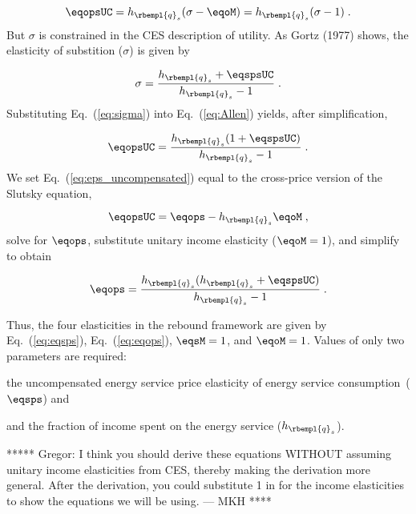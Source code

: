 \begin{equation} \label{eq:Allen}
  \eqopsUC = h_{\rbempl{q}_s} ( \sigma - \eqoM) = h_{\rbempl{q}_s} ( \sigma - 1) \; .
\end{equation}
%
But $\sigma$ is constrained in the CES description of utility. 
As Gortz (1977) shows, the elasticity 
of substition ($\sigma$) is given by

\begin{equation} \label{eq:sigma}
  \sigma  = \frac{h_{\rbempl{q}_s} + \eqspsUC}{h_{\rbempl{q}_s} -1 } \; .
\end{equation}
%
Substituting Eq.~(\ref{eq:sigma}) into Eq.~(\ref{eq:Allen}) yields, 
after simplification,

\begin{equation} \label{eq:eps_uncompensated}
  \eqopsUC =  \frac{h_{\rbempl{q}_s} (1 + \eqspsUC)}{h_{\rbempl{q}_s}-1} \; .
\end{equation}
%
We set Eq.~(\ref{eq:eps_uncompensated}) equal to 
the cross-price version of the Slutsky equation,

\begin{equation}
  \eqopsUC = \eqops - h_{\rbempl{q}_s} \eqoM \; ,
\end{equation}
%
solve for $\eqops$, 
substitute unitary income elasticity ($\eqoM = 1$), and 
simplify to obtain

\begin{equation} \label{eq:eqops}
  \eqops = \frac{h_{\rbempl{q}_s} (h_{\rbempl{q}_s} + \eqspsUC)}{h_{\rbempl{q}_s}-1} \; .
\end{equation}

Thus, the four elasticities in the rebound framework are given by
Eq.~(\ref{eq:eqsps}), 
Eq.~(\ref{eq:eqops}), 
$\eqsM = 1$, and 
$\eqoM = 1$.
Values of only two parameters are required:
%
\begin{enumerate*}[label={(\alph*)}]
	
  \item the uncompensated energy service price elasticity of energy service consumption~($\eqsps$) and
  
  \item and the fraction of income spent on the energy service ($h_{\rbempl{q}_s}$).
    
\end{enumerate*}


***** 
Gregor:  I think you should derive these equations WITHOUT assuming 
unitary income elasticities from CES, 
thereby making the derivation more general. 
After the derivation, you could substitute 1 in for the income elasticities 
to show the equations we will be using. --- MKH 
****
